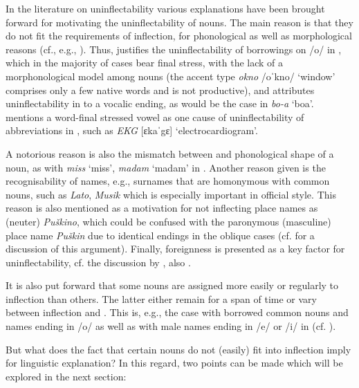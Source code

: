 \documentclass[output=paper,colorlinks,citecolor=brown]{langscibook}
\begin{document}
In the literature on uninflectability various explanations have been brought forward for motivating the uninflectability of nouns. The main reason is that they do not fit the requirements of inflection, for phonological as well as morphological reasons (cf., e.g., \citealt[37]{krzyzanowski2013}). Thus, \citet[225]{isacenko1954} justifies the uninflectability of borrowings on /o/ in , which in the majority of cases bear final stress, with the lack of a morphonological model among  nouns (the accent type \emph{okno} /oˈkno/ `window' comprises only a few  native words and is not productive), and \citet{worth1966} attributes uninflectability in  to a vocalic  ending, as would be the case in \emph{bo-a} `boa'. \citet[30]{krzyzanowski2013} mentions a word-final stressed vowel as one cause of uninflectability of abbreviations in , such as \emph{EKG} [ɛkaˈgɛ] `electrocardiogram'.

A notorious reason is also the mismatch between  and phonological shape of a noun, as with \emph{miss} `miss', \emph{madam} `madam' in  \citep[148]{timberlake2004}. Another reason given is the recognisability of names, e.g., surnames that are homonymous with common nouns, such as  \emph{Lato}, \emph{Musik} \citep{krzyzanowski2013} which is especially important in official style. This reason is also mentioned as a motivation for not inflecting  place names as (neuter) \emph{Puškino}, which could be confused with the paronymous (masculine) place name \emph{Puškin} due to identical endings in the oblique cases (cf. \citealt{tejkin2021} for a discussion of this argument). Finally, foreignness is presented as a key factor for uninflectability, cf. the discussion by \citet[35--42]{krzyzanowski2013}, also \citet[1075--1076]{tejkin2021}.

It is also put forward that some nouns are assigned more easily or regularly to inflection than others. The latter either remain  for a span of time or vary between inflection and . This is, e.g., the case with borrowed common nouns and names ending in /o/ as well as with male names ending in /e/ or /i/ in  (cf. \citealt[20--21]{krzyzanowski2013}).

But what does the fact that certain nouns do not (easily) fit into inflection imply for linguistic explanation? In this regard, two points can be made which will be explored in the next section:
\end{document}
